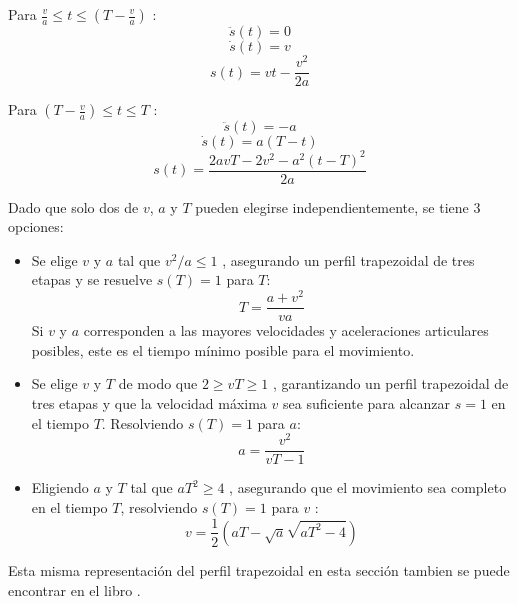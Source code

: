         Para $ \frac{v}{a} \leq t \leq  (T-\frac{v}{a})$ :
        \begin{equation}
            \ddot{s}(t)=0 
            \label{eq:cap4_tray_33}
        \end{equation}
        \begin{equation}
            \dot{s}(t)=v
            \label{eq:cap4_tray_34}
        \end{equation}
        \begin{equation}
             s(t)=vt - \frac{v^2}{2a}
            \label{eq:cap4_tray_35}
        \end{equation}
        
        Para $ (T-\frac{v}{a}) \leq t \leq  T$ :
        \begin{equation}
            \ddot{s}(t)=-a 
            \label{eq:cap4_tray_36}
        \end{equation}
        \begin{equation}
            \dot{s}(t)=a(T-t)
            \label{eq:cap4_tray_37}
        \end{equation}
        \begin{equation}
             s(t)=\frac{2avT-2v^2-a^2(t-T)^2}{2a}
            \label{eq:cap4_tray_38}
        \end{equation}        
        
    Dado que solo dos de $v$, $a$ y $T$ pueden elegirse independientemente, se tiene 3 opciones:
    
    \begin{itemize}
        \item Se elige $v$ y $a$  tal que $v^2/a \leq 1$ , asegurando un perfil trapezoidal de tres etapas y se resuelve $s(T)=1$ para $T$:
        \begin{equation}
            T=\frac{a + v^2}{va}
            \label{eq:cap4_tray_39}
        \end{equation}
        Si $v$ y $a$  corresponden a las mayores velocidades y aceleraciones articulares posibles, este es el tiempo mínimo posible para el movimiento.
        
        \item 	Se elige $v$ y $T$ de modo que $2 \geq vT \geq 1$ , garantizando un perfil trapezoidal de tres etapas y que la velocidad máxima $v$ sea suficiente para alcanzar $s = 1$ en el tiempo $T$. Resolviendo $s(T)=1$   para $a$:
        \begin{equation}
            a=\frac{v^2}{vT-1}
            \label{eq:cap4_tray_40}
        \end{equation}
        
        \item 	Eligiendo $a$ y $T$ tal que $aT^2 \geq 4$ , asegurando que el movimiento sea completo en el tiempo $T$, resolviendo  $s(T)=1$  para $v$ : 
        \begin{equation}
            v=\frac{1}{2}(aT-\sqrt{a}\sqrt{aT^2 - 4})
            \label{eq:cap4_tray_41}
        \end{equation}
    \end{itemize}
        
    Esta misma representación del perfil trapezoidal en esta sección tambien se puede encontrar en el libro \cite{tray_trape}.
        
        
                \newpage
